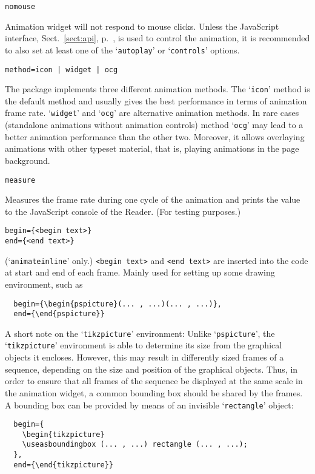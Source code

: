 \documentclass[a4paper]{article}
\begin{document}
\begin{verbatim}
nomouse
\end{verbatim}
Animation widget will not respond to mouse clicks. Unless the JavaScript interface, Sect.~\ref{sect:api}, p.~\pageref{sect:api}, is used to control the animation, it is recommended to also set at least one of the `\verb+autoplay+' or `\verb+controls+' options.
\begin{verbatim}
method=icon | widget | ocg
\end{verbatim}
The package implements three different animation methods. The `\verb+icon+' method is the default method and usually gives the best performance in terms of animation frame rate. `\verb+widget+' and `\verb+ocg+' are alternative animation methods. In rare cases (standalone animations without animation controls) method `\verb+ocg+' may lead to a better animation performance than the other two. Moreover, it allows overlaying animations with other typeset material, that is, playing animations in the page background.
\begin{verbatim}
measure
\end{verbatim}
Measures the frame rate during one cycle of the animation and prints the value to the JavaScript console of the Reader. (For testing purposes.)
\begin{verbatim}
begin={<begin text>}
end={<end text>}
\end{verbatim}\hypertarget{beginend}{}%
(`\verb+animateinline+' only.) \verb+<begin text>+ and \verb+<end text>+ are inserted into the code at start and end of each frame. Mainly used for setting up some drawing environment, such as
\begin{verbatim}
  begin={\begin{pspicture}(... , ...)(... , ...)},
  end={\end{pspicture}}
\end{verbatim}
A short note on the `\verb+tikzpicture+' environment: Unlike `\verb+pspicture+', the `{\tt tikz\-pic\-ture}' environment is able to determine its size from the graphical objects it encloses. However, this may result in differently sized frames of a sequence, depending on the size and position of the graphical objects. Thus, in order to ensure that all frames of the sequence be displayed at the same scale in the animation widget, a common bounding box should be shared by the frames. A bounding box can be provided by means of an invisible `\verb+rectangle+' object:
\begin{verbatim}
  begin={
    \begin{tikzpicture}
    \useasboundingbox (... , ...) rectangle (... , ...);
  },
  end={\end{tikzpicture}}
\end{verbatim}
\end{document}
